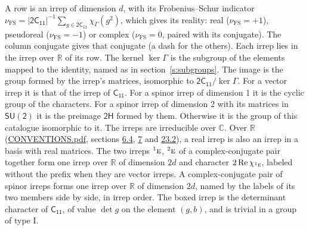 \documentclass[10pt,a4paper]{article}
\numberwithin{equation}{section}
\newcommand{\grp}[1]{\mathsf{#1}}
\newcommand{\irr}[1]{\text{\normalfont\scshape #1}}
\newcommand{\conjpair}[1]{{}^{#1}}
\newcommand{\irchar}[1]{\chi_{#1}}
\newcommand{\fsind}{\nu_{\mathrm{FS}}}
\begin{document}
\leavevmode\label{n:index.frobenius}\label{n:head.irrep}\label{n:head.reality}A row is an irrep of dimension $d$, with its Frobenius--Schur indicator $\fsind = |\grp{2C_{11}}|^{-1}\allowbreak\sum_{g\in\grp{2C_{11}}}\irchar{\Gamma}(g^2)$, which gives its reality: real ($\fsind = +1$), pseudoreal ($\fsind = -1$) or complex ($\fsind = 0$, paired with its conjugate). \label{n:head.conjugate}The column conjugate gives that conjugate (a dash for the others). \label{n:head.over.real}Each irrep lies in the irrep over $\mathbb{R}$ of its row. \label{n:head.kernel}The kernel $\ker\Gamma$ is the subgroup of the elements mapped to the identity, named as in section~\ref{s:subgroups}. \label{n:head.image}The image is the group formed by the irrep's matrices, isomorphic to $\grp{2C_{11}}/\ker\Gamma$. For a vector irrep it is that of the irrep of \href{../../../rotation/data/pdf/C11.pdf}{$\grp{C_{11}}$}. For a spinor irrep of dimension 1 it is the cyclic group of the characters. For a spinor irrep of dimension 2 with its matrices in $\grp{SU(2)}$ it is the preimage $\grp{2H}$ formed by them. Otherwise it is the group of this catalogue isomorphic to it. The irreps are irreducible over $\mathbb{C}$. Over $\mathbb{R}$ (\href{../../CONVENTIONS.pdf}{CONVENTIONS.pdf}, sections \href{../../../rotation/CONVENTIONS.pdf\#conv.6.4}{6.4}, \href{../../../rotation/CONVENTIONS.pdf\#conv.7}{7} and \href{../../CONVENTIONS.pdf\#conv.23.2}{23.2}), a real irrep is also an irrep in a basis with real matrices. The two irreps $\conjpair{1}\irr{e}$, $\conjpair{2}\irr{e}$ of a complex-conjugate pair together form one irrep over $\mathbb{R}$ of dimension $2d$ and character $2\operatorname{Re}\irchar{\conjpair{1}\irr{e}}$, labeled without the prefix when they are vector irreps. A complex-conjugate pair of spinor irreps forms one irrep over $\mathbb{R}$ of dimension $2d$, named by the labels of its two members side by side, in irrep order. \label{n:mark.determinant}The boxed irrep is the determinant character of \href{../../../rotation/data/pdf/C11.pdf}{$\grp{C_{11}}$}, of value $\det g$ on the element $(g, b)$, and is trivial in a group of type I.
\setlength{\emergencystretch}{2em}\par\setlength{\emergencystretch}{0pt}
\end{document}
